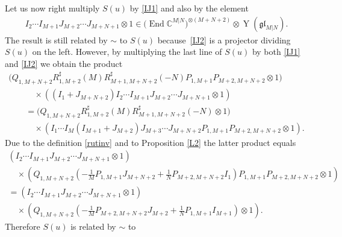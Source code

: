 \documentclass[10pt,a4paper]{amsart}
\numberwithin{equation}{section}
\def\CC{{\mathbb{C}}}
\def\CMN{\CC^{M|N}}
\def\End{\operatorname{End}}
\def\glMN{\mathfrak{gl}_{M|N}}
\def\ot{\otimes}
\def\RS{R^{\sharp}}
\def\YMN{\operatorname{Y}(\glMN)}
\begin{document}
Let us now right multiply $S(u)$ by \eqref{IJ1} and also by the element
\begin{gather}
\label{IJ2}
I_{2} \cdots I_{M+1}
J_{M+2} \cdots J_{M+N+1}\ot1\in
\big(\End\CMN\big)^{\ot (M+N+2)}\ot\YMN .
\end{gather}
The result is still related by $\sim$ to $S(u)$ because~\eqref{IJ2}
is a projector dividing $S(u)$ on the left.
However, by multiplying the last line of $S(u)$
by both \eqref{IJ1} and \eqref{IJ2} we obtain the product
\begin{gather*}
 \big( Q_{1,M+N+2} \RS_{1,M+2} (M ) \RS_{M+1,M+N+2} (-N )
P_{1,M+1} P_{M+2,M+N+2}\ot1 \big)\\
\qquad\quad{} \times
( ( I_{1}+J_{M+N+2} )
I_{2} \cdots I_{M+1}
J_{M+2} \cdots J_{M+N+1}\ot1 ) \\
\qquad{} =
\big( Q_{1,M+N+2} \RS_{1,M+2} (M ) \RS_{M+1,M+N+2} (-N )
\ot1 \big)\\
\qquad\quad{} \times
( I_{1} \cdots I_{M} ( I_{M+1}+J_{M+2} )
J_{M+3} \cdots J_{M+N+2}
P_{1,M+1} P_{M+2,M+N+2}\ot1 ) .
\end{gather*}Due to the definition \eqref{rutinv} and to
Proposition \ref{L2} the latter product equals
\begin{gather*}
 ( I_{2} \cdots I_{M+1}
J_{M+2} \cdots J_{M+N+1}\ot1 )\\
\quad{} \times
\left( Q_{1,M+N+2}
\left(- \frac1M P_{1,M+1} J_{M+N+2}+
\frac1N P_{M+2,M+N+2} I_{1} \right)
 P_{1,M+1} P_{M+2,M+N+2}\ot1 \right)\\
{} =
( I_{2} \cdots I_{M+1}
J_{M+2} \cdots J_{M+N+1}\ot1 )\\
\quad{} \times
\left( Q_{1,M+N+2}
\left(- \frac1M P_{M+2,M+N+2} J_{M+2}+
\frac1N P_{1,M+1} I_{M+1} \right)\ot1 \right) .
\end{gather*}
Therefore $S(u)$ is related by $\sim$ to
\end{document}
